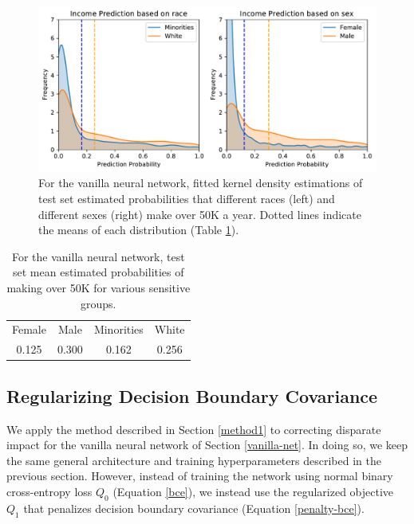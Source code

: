 \documentclass{article}
\begin{document}
\begin{figure}[ht]
\vskip 0.2in
\begin{center}
\centerline{\includegraphics[width=\columnwidth]{img/vanilla-bias.pdf}}
\caption{For the vanilla neural network, fitted kernel density estimations of test set estimated probabilities that different races (left) and different sexes (right) make over 50K a year.  Dotted lines indicate the means of each distribution (Table \ref{vanilla-table}).}
\label{vanilla-nn}
\end{center}
\vskip -0.2in
\end{figure}

\begin{table}[h]
\centering
\begin{tabular}{c|c||c |c} 
 \hline
 Female & Male & Minorities & White \\ [0.5ex] 
 0.125 & 0.300 & 0.162 & 0.256 \\
 \hline
\end{tabular}
\caption{For the vanilla neural network, test set mean estimated probabilities of making over 50K for various sensitive groups.} \label{vanilla-table}
\end{table}

\subsection{Regularizing Decision Boundary Covariance}

We apply the method described in Section \ref{method1} to correcting disparate impact for the vanilla neural network of Section \ref{vanilla-net}.  In doing so, we keep the same general architecture and training hyperparameters described in the previous section.  However, instead of training the network using normal binary cross-entropy loss $Q_0$  (Equation \ref{bce}), we instead use the regularized objective $Q_1$ that penalizes decision boundary covariance (Equation \ref{penalty-bce}).  
\end{document}

